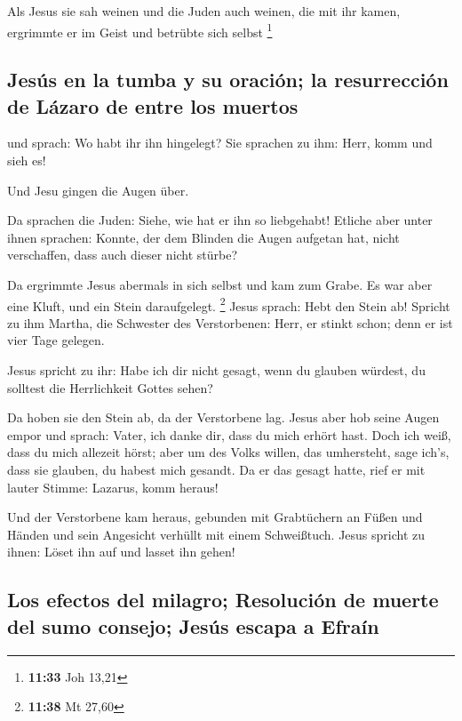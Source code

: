  Als Jesus sie sah weinen und die Juden auch weinen, die
mit ihr kamen, ergrimmte er im Geist und betrübte sich selbst
\footnote{\textbf{11:33} Joh 13,21}

\hypertarget{jesuxfas-en-la-tumba-y-su-oraciuxf3n-la-resurrecciuxf3n-de-luxe1zaro-de-entre-los-muertos}{%
\subsection{Jesús en la tumba y su oración; la resurrección de Lázaro de
entre los
muertos}\label{jesuxfas-en-la-tumba-y-su-oraciuxf3n-la-resurrecciuxf3n-de-luxe1zaro-de-entre-los-muertos}}

 und sprach: Wo habt ihr ihn hingelegt? Sie sprachen zu
ihm: Herr, komm und sieh es!

 Und Jesu gingen die Augen über.

 Da sprachen die Juden: Siehe, wie hat er ihn so
liebgehabt!  Etliche aber unter ihnen sprachen: Konnte,
der dem Blinden die Augen aufgetan hat, nicht verschaffen, dass auch
dieser nicht stürbe?

 Da ergrimmte Jesus abermals in sich selbst und kam zum
Grabe. Es war aber eine Kluft, und ein Stein daraufgelegt. \footnote{\textbf{11:38}
  Mt 27,60}  Jesus sprach: Hebt den Stein ab! Spricht zu
ihm Martha, die Schwester des Verstorbenen: Herr, er stinkt schon; denn
er ist vier Tage gelegen.

 Jesus spricht zu ihr: Habe ich dir nicht gesagt, wenn du
glauben würdest, du solltest die Herrlichkeit Gottes sehen?

 Da hoben sie den Stein ab, da der Verstorbene lag. Jesus
aber hob seine Augen empor und sprach: Vater, ich danke dir, dass du
mich erhört hast.  Doch ich weiß, dass du mich allezeit
hörst; aber um des Volks willen, das umhersteht, sage ich's, dass sie
glauben, du habest mich gesandt.  Da er das gesagt hatte,
rief er mit lauter Stimme: Lazarus, komm heraus!

 Und der Verstorbene kam heraus, gebunden mit Grabtüchern
an Füßen und Händen und sein Angesicht verhüllt mit einem Schweißtuch.
Jesus spricht zu ihnen: Löset ihn auf und lasset ihn gehen!

\hypertarget{los-efectos-del-milagro-resoluciuxf3n-de-muerte-del-sumo-consejo-jesuxfas-escapa-a-efrauxedn}{%
\subsection{Los efectos del milagro; Resolución de muerte del sumo
consejo; Jesús escapa a
Efraín}\label{los-efectos-del-milagro-resoluciuxf3n-de-muerte-del-sumo-consejo-jesuxfas-escapa-a-efrauxedn}}

